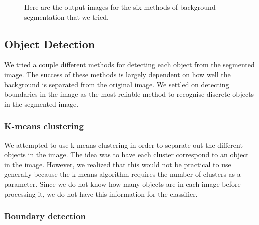 \documentclass[12pt]{article}
\begin{document}
\begin{figure}
{		\label{fig:mean_shift}
	}
	
	\label{fig:bgseg}
	\caption{Here are the output images for the six methods of background segmentation that we tried.}
	
\end{figure}

\subsection{Object Detection}

We tried a couple different methods for detecting each object from the segmented image. The success of these methods is largely dependent on how well the background is separated from the original image. We settled on detecting boundaries in the image as the most reliable method to recognise discrete objects in the segmented image.

\subsubsection{K-means clustering}

We attempted to use k-means clustering in order to separate out the different objects in the image. The idea was to have each cluster correspond to an object in the image. However, we realized that this would not be practical to use generally because the k-means algorithm requires the number of clusters as a parameter. Since we do not know how many objects are in each image before processing it, we do not have this information for the classifier.

\subsubsection{Boundary detection}
\end{document}
